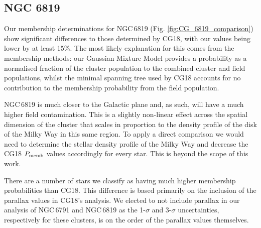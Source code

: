 \subsection{NGC 6819}

Our membership determinations for NGC\,6819 (Fig. \ref{fig:CG_6819_comparison}) show significant differences to those determined by CG18, with our values being lower by at least 15\%. The most likely explanation for this comes from the membership methods: our Gaussian Mixture Model provides a probability as a normalised fraction of the cluster population to the combined cluster and field populations, whilst the minimal spanning tree used by CG18 accounts for no contribution to the membership probability from the field population. 

NGC\,6819 is much closer to the Galactic plane and, as such, will have a much higher field contamination. This is a slightly non-linear effect across the spatial dimension of the cluster that scales in proportion to the density profile of the disk of the Milky Way in this same region. To apply a direct comparison we would need to determine the stellar density profile of the Milky Way and decrease the CG18 $P_{\rm memb}$ values accordingly for every star. This is beyond the scope of this work.

There are a number of stars we classify as having much higher membership probabilities than CG18. This difference is based primarily on the inclusion of the parallax values in CG18's analysis. We elected to not include parallax in our analysis of NGC\,6791 and NGC\,6819 as the 1-$\sigma$ and 3-$\sigma$ uncertainties, respectively for these clusters, is on the order of the parallax values themselves.

